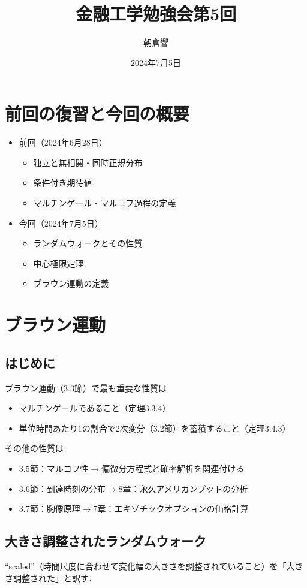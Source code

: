\documentclass[a4paper, lualatex, ja=standard]{bxjsarticle}
\title{金融工学勉強会第5回}
\author{朝倉響}
\date{2024年7月5日}
\theoremstyle{definition}
\begin{document}
\maketitle

\setcounter{section}{2}
\section*{前回の復習と今回の概要}
\begin{itemize}
  \item 前回（2024年6月28日）
  \begin{itemize}
    \item 独立と無相関・同時正規分布
    \item 条件付き期待値
    \item マルチンゲール・マルコフ過程の定義
  \end{itemize}
  \item 今回（2024年7月5日）
  \begin{itemize}
    \item ランダムウォークとその性質
    \item 中心極限定理
    \item ブラウン運動の定義
  \end{itemize}
\end{itemize}

\section{ブラウン運動}
\subsection{はじめに}
ブラウン運動（3.3節）で最も重要な性質は
\begin{itemize}
  \item マルチンゲールであること（定理3.3.4）
  \item 単位時間あたり$1$の割合で2次変分（3.2節）を蓄積すること（定理3.4.3）
\end{itemize}
その他の性質は
\begin{itemize}
  \item 3.5節：マルコフ性$\to$偏微分方程式と確率解析を関連付ける
  \item 3.6節：到達時刻の分布$\to$8章：永久アメリカンプットの分析
  \item 3.7節：胸像原理$\to$7章：エキゾチックオプションの価格計算
\end{itemize}

\subsection{大きさ調整されたランダムウォーク}
``scaled''（時間尺度に合わせて変化幅の大きさを調整されていること）を「大きさ調整された」と訳す．
\end{document}
